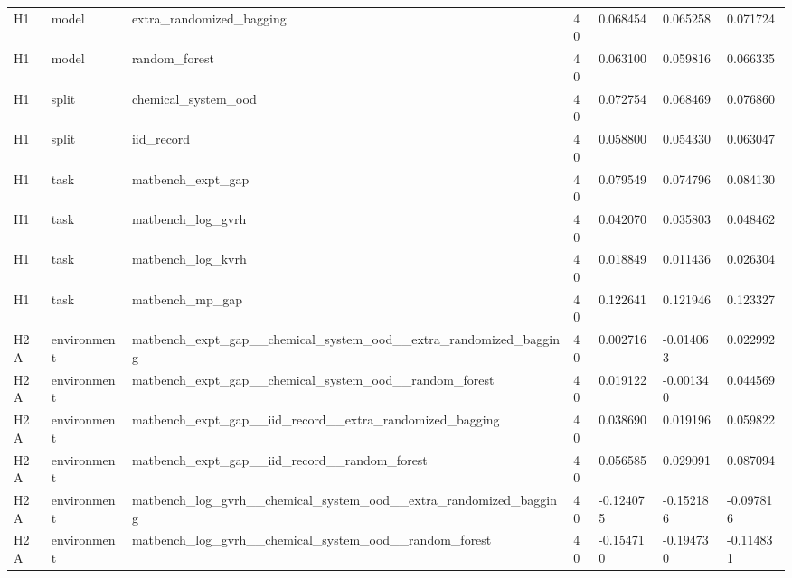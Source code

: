 \documentclass[10pt]{article}
\begin{document}
\begin{landscape}
\begin{longtable}{L{.35in}L{.6in}L{3.55in}L{.4in}L{.88in}L{.88in}L{.88in}}
H1 & model & extra\_\allowbreak{}randomized\_\allowbreak{}bagging & 40 & 0.068454 & 0.065258 & 0.071724\\
H1 & model & random\_\allowbreak{}forest & 40 & 0.063100 & 0.059816 & 0.066335\\
H1 & split & chemical\_\allowbreak{}system\_\allowbreak{}ood & 40 & 0.072754 & 0.068469 & 0.076860\\
H1 & split & iid\_\allowbreak{}record & 40 & 0.058800 & 0.054330 & 0.063047\\
H1 & task & matbench\_\allowbreak{}expt\_\allowbreak{}gap & 40 & 0.079549 & 0.074796 & 0.084130\\
H1 & task & matbench\_\allowbreak{}log\_\allowbreak{}gvrh & 40 & 0.042070 & 0.035803 & 0.048462\\
H1 & task & matbench\_\allowbreak{}log\_\allowbreak{}kvrh & 40 & 0.018849 & 0.011436 & 0.026304\\
H1 & task & matbench\_\allowbreak{}mp\_\allowbreak{}gap & 40 & 0.122641 & 0.121946 & 0.123327\\
H2A & environment & matbench\_\allowbreak{}expt\_\allowbreak{}gap\_\allowbreak{}\_\allowbreak{}chemical\_\allowbreak{}system\_\allowbreak{}ood\_\allowbreak{}\_\allowbreak{}extra\_\allowbreak{}randomized\_\allowbreak{}bagging & 40 & 0.002716 & -0.014063 & 0.022992\\
H2A & environment & matbench\_\allowbreak{}expt\_\allowbreak{}gap\_\allowbreak{}\_\allowbreak{}chemical\_\allowbreak{}system\_\allowbreak{}ood\_\allowbreak{}\_\allowbreak{}random\_\allowbreak{}forest & 40 & 0.019122 & -0.001340 & 0.044569\\
H2A & environment & matbench\_\allowbreak{}expt\_\allowbreak{}gap\_\allowbreak{}\_\allowbreak{}iid\_\allowbreak{}record\_\allowbreak{}\_\allowbreak{}extra\_\allowbreak{}randomized\_\allowbreak{}bagging & 40 & 0.038690 & 0.019196 & 0.059822\\
H2A & environment & matbench\_\allowbreak{}expt\_\allowbreak{}gap\_\allowbreak{}\_\allowbreak{}iid\_\allowbreak{}record\_\allowbreak{}\_\allowbreak{}random\_\allowbreak{}forest & 40 & 0.056585 & 0.029091 & 0.087094\\
H2A & environment & matbench\_\allowbreak{}log\_\allowbreak{}gvrh\_\allowbreak{}\_\allowbreak{}chemical\_\allowbreak{}system\_\allowbreak{}ood\_\allowbreak{}\_\allowbreak{}extra\_\allowbreak{}randomized\_\allowbreak{}bagging & 40 & -0.124075 & -0.152186 & -0.097816\\
H2A & environment & matbench\_\allowbreak{}log\_\allowbreak{}gvrh\_\allowbreak{}\_\allowbreak{}chemical\_\allowbreak{}system\_\allowbreak{}ood\_\allowbreak{}\_\allowbreak{}random\_\allowbreak{}forest & 40 & -0.154710 & -0.194730 & -0.114831\\

\end{longtable}
\end{landscape}
\end{document}
